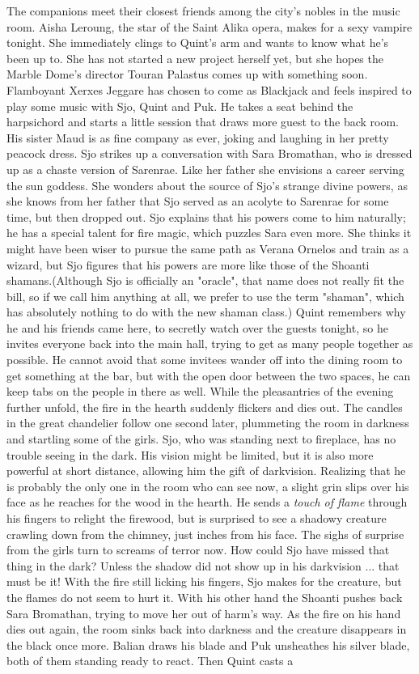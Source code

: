 The companions meet their closest friends among the city's nobles in the music room. Aisha Leroung, the star of the Saint Alika opera, makes for a sexy vampire tonight. She immediately clings to Quint's arm and wants to know what he's been up to. She has not started a new project herself yet, but she hopes the Marble Dome's director Touran Palastus comes up with something soon. Flamboyant Xerxes Jeggare has chosen to come as Blackjack and feels inspired to play some music with Sjo, Quint and Puk. He takes a seat behind the harpsichord and starts a little session that draws more guest to the back room. His sister Maud is as fine company as ever, joking and laughing in her pretty peacock dress. Sjo strikes up a conversation with Sara Bromathan, who is dressed up as a chaste version of Sarenrae. Like her father she envisions a career serving the sun goddess. She wonders about the source of Sjo's strange divine powers, as she knows from her father that Sjo served as an acolyte to Sarenrae for some time, but then dropped out. Sjo explains that his powers come to him naturally; he has a special talent for fire magic, which puzzles Sara even more. She thinks it might have been wiser to pursue the same path as Verana Ornelos and train as a wizard, but Sjo figures that his powers are more like those of the Shoanti shamans.(Although Sjo is officially an "oracle", that name does not really fit the bill, so if we call him anything at all, we prefer to use the term "shaman", which has absolutely nothing to do with the new shaman class.) Quint remembers why he and his friends came here, to secretly watch over the guests tonight, so he invites everyone back into the main hall, trying to get as many people together as possible. He cannot avoid that some invitees wander off into the dining room to get something at the bar, but with the open door between the two spaces, he can keep tabs on the people in there as well. While the pleasantries of the evening further unfold, the fire in the hearth suddenly flickers and dies out. The candles in the great chandelier follow one second later, plummeting the room in darkness and startling some of the girls. Sjo, who was standing next to fireplace, has no trouble seeing in the dark. His vision might be limited, but it is also more powerful at short distance, allowing him the gift of darkvision. Realizing that he is probably the only one in the room who can see now, a slight grin slips over his face as he reaches for the wood in the hearth. He sends a {\itshape touch of flame} through his fingers to relight the firewood, but is surprised to see a shadowy creature crawling down from the chimney, just inches from his face. The sighs of surprise from the girls turn to screams of terror now. How could Sjo have missed that thing in the dark? Unless the shadow did not show up in his darkvision ... that must be it! With the fire still licking his fingers, Sjo makes for the creature, but the flames do not seem to hurt it. With his other hand the Shoanti pushes back Sara Bromathan, trying to move her out of harm's way. As the fire on his hand dies out again, the room sinks back into darkness and the creature disappears in the black once more. Balian draws his blade and Puk unsheathes his silver blade, both of them standing ready to react. Then Quint casts a  